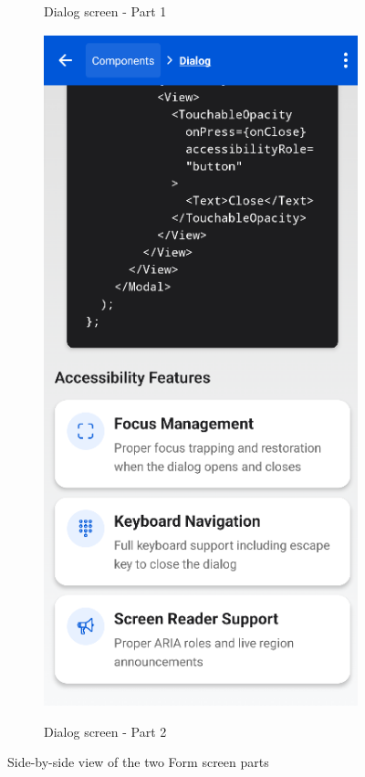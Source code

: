 \begin{figure}[ht]
\begin{subfigure}[b]{0.48\textwidth}
        \caption{Dialog screen - Part 1}
        \label{fig:dialog-left}
    \end{subfigure}
    \hfill
    \begin{subfigure}[b]{0.48\textwidth}
        \centering
        \includegraphics[width=\linewidth, alt={Second part of the Dialog Screen}]{img/dialog2.png}
        \caption{Dialog screen - Part 2}
        \label{fig:dialog-right}
    \end{subfigure}
    \caption{Side-by-side view of the two Form screen parts}
    \label{fig:dialog_screens_sidebyside}
\end{figure}

